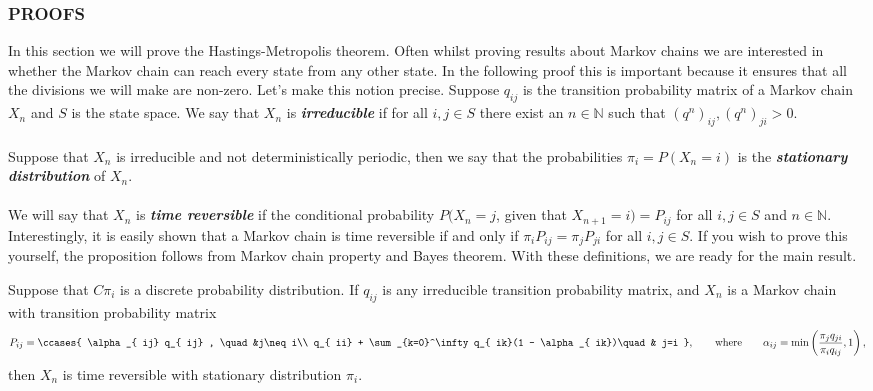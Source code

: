 \documentclass[11pt,english,a4paper]{article}
\begin{document}
\subsubsection*{\uppercase{Proofs}}

In this section we will prove the Hastings-Metropolis theorem. Often whilst proving results about Markov chains we are interested in whether the Markov chain can reach every state from any other state. In the following proof this is important because it ensures that all the divisions we will make are non-zero. Let's make this notion precise. Suppose $q_{  ij}$ is the transition probability matrix of a Markov chain $X_n$ and $S$ is the state space. We say that $X_n$ is \textit{\textbf{irreducible}} if for all $i,j \in S$ there exist an $n \in \mathbb{N}$ such that $(q^n)_{  ij}, (q^n)_{  ji} > 0$.\\
\\
Suppose that $X_n$ is irreducible and not deterministically periodic, then we say that the probabilities $\pi_i = P(X_n = i)$ is the \textit{\textbf{stationary distribution}} of $X_n$.\\
\\
We will say that $X_n$ is \textit{\textbf{time reversible}} if the conditional probability $P(X_{n} = j$, given that $X_{n+1} = i) = P_{  ij}$ for all $i,j \in S$ and $n \in \mathbb{N}$. Interestingly, it is easily shown that a Markov chain is time reversible if and only if $\pi_i P_{  ij} = \pi_j P_{  ji}$ for all $i,j \in S$. If you wish to prove this yourself, the proposition follows from Markov chain property and Bayes theorem. With these definitions, we are ready for the main result.
\begin{theorem}
Suppose that $C\pi_i$ is a discrete probability distribution. If $q_{ij}$ is any irreducible transition probability matrix, and $X_n$ is a Markov chain with transition probability matrix 
\begin{equation}
P_{ij} = \ccases {
\alpha_{  ij} q_{  ij} , \quad &j\neq i\\
q_{  ii} + \sum_{k=0}^\infty q_{  ik}(1 - \alpha_{  ik})\quad & j=i
},\qquad \text{where} \qquad \alpha_{  ij} = \min \left( \frac{\pi_j q_{  ji}}{\pi_i q_{  ij}} , 1\right), \label{eq:metropolis}
\end{equation}
then $X_n$ is time reversible with stationary distribution $\pi_i$. \label{thm:metropolis}
\end{theorem}
\end{document}
